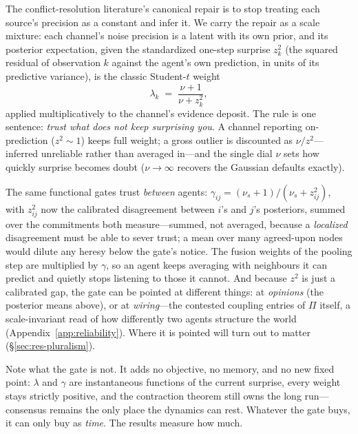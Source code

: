 \documentclass[runningheads]{llncs}
\begin{document}
The conflict-resolution literature's canonical repair \citep{ohagan2012} is to stop treating each
source's precision as a constant and infer it. We carry the repair as a scale mixture: each
channel's noise precision is a latent with its own prior, and its posterior expectation, given
the standardized one-step surprise $z_k^2$ (the squared residual of observation $k$ against the
agent's own prediction, in units of its predictive variance), is the classic Student-$t$ weight
\begin{equation}
\lambda_k \;=\; \frac{\nu+1}{\nu+z_k^2},
\label{eq:lambda}
\end{equation}
applied multiplicatively to the channel's evidence deposit. The rule is one sentence: \emph{trust
what does not keep surprising you}. A channel reporting on-prediction ($z^2\!\sim\!1$) keeps full
weight; a gross outlier is discounted as $\nu/z^2$---inferred unreliable rather than averaged
in---and the single dial $\nu$ sets how quickly surprise becomes doubt ($\nu\to\infty$ recovers
the Gaussian defaults exactly).

The same functional gates trust \emph{between} agents: $\gamma_{ij}=(\nu_s+1)/(\nu_s+z_{ij}^2)$,
with $z_{ij}^2$ now the calibrated disagreement between $i$'s and $j$'s posteriors, summed over
the commitments both measure---summed, not averaged, because a \emph{localized} disagreement must
be able to sever trust; a mean over many agreed-upon nodes would dilute any heresy below the
gate's notice. The fusion weights of the pooling step are multiplied by $\gamma$, so an agent
keeps averaging with neighbours it can predict and quietly stops listening to those it cannot.
And because $z^2$ is just a calibrated gap, the gate can be pointed at different things: at
\emph{opinions} (the posterior means above), or at \emph{wiring}---the contested coupling entries
of $\Pi$ itself, a scale-invariant read of how differently two agents structure the world
(Appendix~\ref{app:reliability}). Where it is pointed will turn out to matter
(\S\ref{sec:res-pluralism}).

Note what the gate is not. It adds no objective, no memory, and no new fixed point: $\lambda$ and
$\gamma$ are instantaneous functions of the current surprise, every weight stays strictly
positive, and the contraction theorem still owns the long run---consensus remains the only place
the dynamics can rest. Whatever the gate buys, it can only buy as \emph{time}. The results
measure how much.

\end{document}
